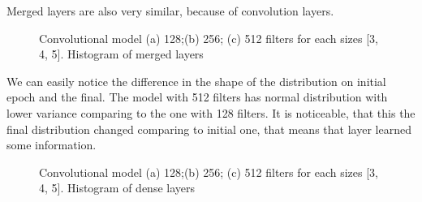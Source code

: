 \noindent
\\
\\
\\
\\
\\
Merged layers are also very similar, because of convolution layers.

\begin{figure}[ht]
	\begin{minipage}[ht]{1\linewidth}
	\end{minipage}
	\hfill
	\begin{minipage}[ht]{1\linewidth}
	\end{minipage}
	\begin{minipage}[ht]{1\linewidth}
	\end{minipage}
	\caption{Convolutional model (a) 128;(b) 256; (c) 512 filters for each sizes [3, 4, 5]. Histogram of merged layers}
	\label{img:3CNN_merged_layers}  
\end{figure}

\clearpage
We can easily notice the difference in the shape of the distribution on initial epoch and the final. The model with 512 filters has normal distribution with lower variance comparing to the one with 128 filters. It is noticeable, that this the final distribution changed comparing to initial one, that means that layer learned some information. 

\begin{figure}[ht]
	\begin{minipage}[ht]{1\linewidth}
	\end{minipage}
	\hfill
	\begin{minipage}[ht]{1\linewidth}
	\end{minipage}
	\begin{minipage}[ht]{1\linewidth}
	\end{minipage}
	\caption{Convolutional model (a) 128;(b) 256; (c) 512 filters for each sizes [3, 4, 5]. Histogram of dense layers}
	\label{img:3CNN_dense_layers}  
\end{figure}

